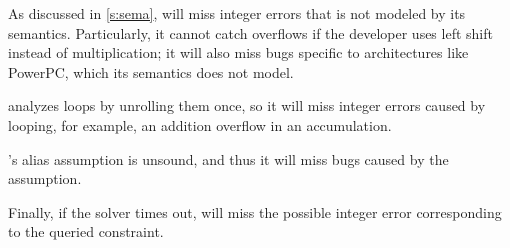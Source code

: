As discussed in \autoref{s:sema}, \sys will miss integer errors
that is not modeled by its semantics.  Particularly, it cannot catch
overflows if the developer uses left shift instead of multiplication;
it will also miss bugs specific to architectures like PowerPC, which
its semantics does not model.

\sys analyzes loops by unrolling them once, so it will miss integer
errors caused by looping, for example, an addition overflow in an
accumulation.

\sys's alias assumption is unsound, and thus it will miss bugs
caused by the assumption.

Finally, if the solver times out, \sys will miss the possible integer
error corresponding to the queried constraint.
